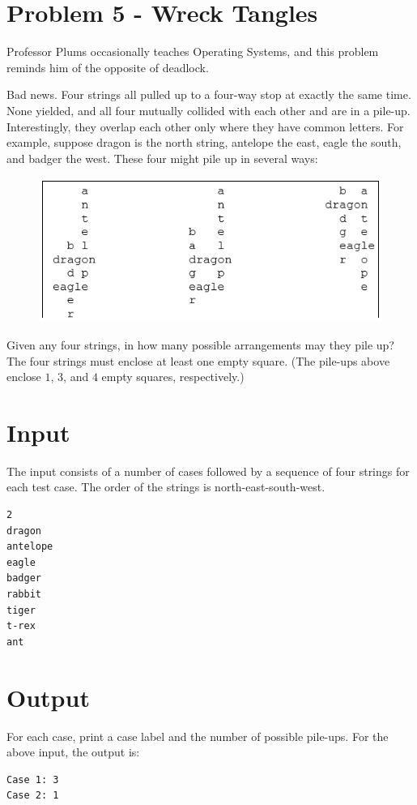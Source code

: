 \documentclass{article}
\begin{document}

\section*{Problem 5 - Wreck Tangles}

Professor Plums occasionally teaches Operating Systems, and this problem reminds him of the opposite of deadlock.

Bad news. Four strings all pulled up to a four-way stop at exactly the same time. None yielded, and all four mutually collided with each other and are in a pile-up. Interestingly, they overlap each other only where they have common letters. For example, suppose dragon is the north string, antelope the east, eagle the south, and badger the west. These four might pile up in several ways:

\begin{figure}[h]
\begin{center}
\includegraphics{problem5words.png} 
\end{center}
\end{figure}

Given any four strings, in how many possible arrangements may they pile up? The four strings must enclose at least one empty square. (The pile-ups above enclose $1$, $3$, and $4$ empty squares, respectively.)

\section*{Input}
The input consists of a number of cases followed by a sequence of four strings for each test case. The order of the strings is north-east-south-west.
\begin{verbatim}
2 
dragon 
antelope 
eagle 
badger 
rabbit 
tiger 
t-rex 
ant
\end{verbatim}

\section*{Output}
For each case, print a case label and the number of possible pile-ups. For the above input, the output is:

\begin{verbatim}
Case 1: 3 
Case 2: 1
\end{verbatim}
\end{document}

